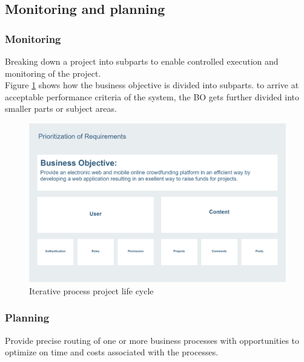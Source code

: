 \subsection*{Monitoring and planning}
\subsubsection*{Monitoring}
Breaking down a project into subparts to enable controlled execution and monitoring of the project.\\
Figure \ref{fig:bos} shows how the business objective is divided into subparts. to arrive at acceptable performance criteria of the system, the BO gets further divided into smaller parts or subject areas.
\begin{figure}[!ht]
      \center
      \includegraphics[scale=0.20]{assets/bos.png}
      \caption{Iterative process project life cycle}
      \label{fig:bos}
\end{figure}
\subsubsection*{Planning}
Provide precise routing of one or more business processes with opportunities to optimize on time and costs associated with the processes.


